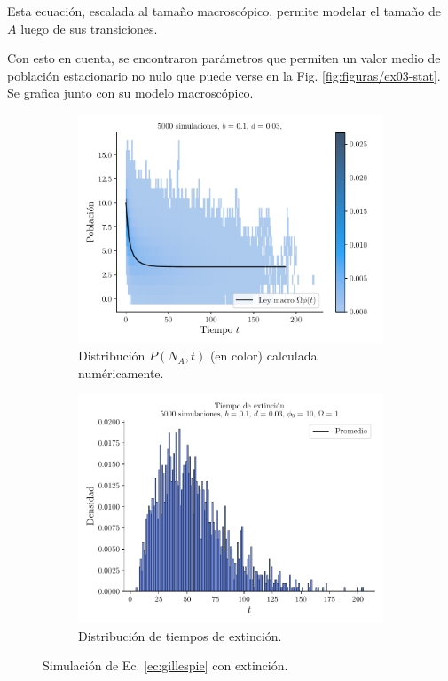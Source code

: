 \documentclass[twocolumn,aps,prl]{revtex4-1}
\begin{document}
Esta ecuación, escalada al tamaño macroscópico, permite modelar el tamaño de $A$ luego de sus transiciones.

Con esto en cuenta, se encontraron parámetros que permiten un valor medio de población estacionario no nulo que puede verse en la Fig. \ref{fig:figuras/ex03-stat}. Se grafica junto con su modelo macroscópico.

\begin{figure}[ht!]
  \centering
  \begin{subfigure}[b]{0.49\linewidth}
      \centering
      \includegraphics[width = 0.999\textwidth]{figuras/ex03-c-SinCota.pdf}
      \caption{Distribución $P(N_A,t)$ (en color) calculada numéricamente.}
      \label{fig:figuras/ex03-c-SinCota}
  \end{subfigure}\quad
  \begin{subfigure}[b]{0.49\linewidth}
      \centering
      \includegraphics[width = 0.999\textwidth]{figuras/ex03-e-SinCota.pdf}
      \caption{Distribución de tiempos de extinción.}
      \label{fig:figuras/ex03-e-SinCota}
  \end{subfigure}\quad
  \caption{Simulación de Ec. \ref{ec:gillespie} con extinción.}
  \label{fig:figuras/ex03-kill}
\end{figure}
\end{document}
